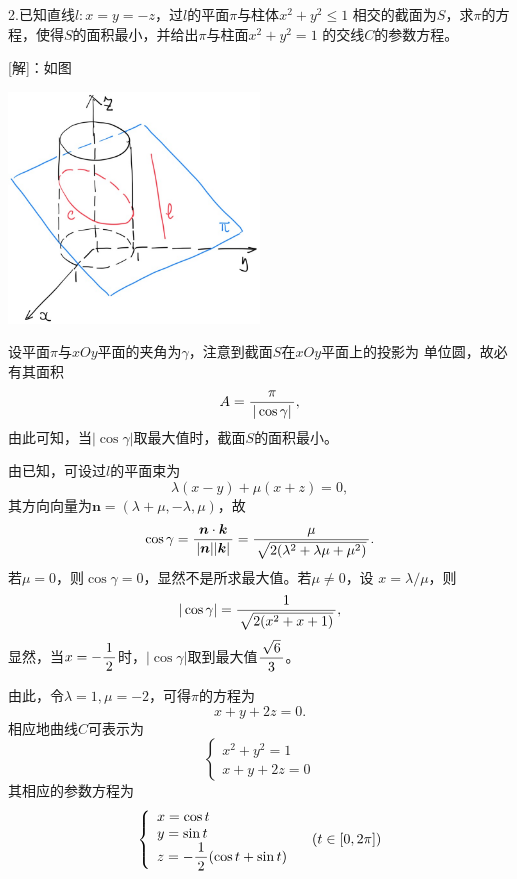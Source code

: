 \bs

2.已知直线$l:x=y=-z$，过$l$的平面$\pi$与柱体$x^2+y^2\leq1$
相交的截面为$S$，求$\pi$的方程，使得$S$的面积最小，并给出$\pi$与柱面$x^2+y^2=1$
的交线$C$的参数方程。

[解]：如图
\begin{center}
	\includegraphics[width=0.5\textwidth]{./images/ch8/ccS.jpg}
\end{center}
设平面$\pi$与$xOy$平面的夹角为$\gamma$，注意到截面$S$在$xOy$平面上的投影为
单位圆，故必有其面积
$$A=\displaystyle\frac{\,{\pi}\,}{\,{|\cos\gamma|}\,},$$
由此可知，当$|\cos\gamma|$取最大值时，截面$S$的面积最小。

由已知，可设过$l$的平面束为
$$\lambda(x-y)+\mu(x+z)=0,$$
其方向向量为$\bm{n}=(\lambda+\mu,-\lambda,\mu)$，故
$$\cos\gamma=\displaystyle\frac{\,{\bm{n}\cdot\bm{k}}\,}{\,{|\bm{n}||\bm{k}|}\,}
=\displaystyle\frac{\,{\mu}\,}{\,{\sqrt{2(\lambda^2+\lambda\mu+\mu^2)}}\,}.$$
若$\mu=0$，则$\cos\gamma=0$，显然不是所求最大值。若$\mu\ne0$，设
$x=\lambda/\mu$，则
$$|\cos\gamma|=\displaystyle\frac{\,{1}\,}{\,{\sqrt{2(x^2+x+1)}}\,},$$
显然，当$x=-\displaystyle\frac{\,{1}\,}{\,{2}\,}$时，$|\cos\gamma|$取到最大值$\displaystyle\frac{\,{\sqrt6}\,}{\,{3}\,}$。

由此，令$\lambda=1,\mu=-2$，可得$\pi$的方程为
$$x+y+2z=0.$$
相应地曲线$C$可表示为
$$\left\{\begin{array}{l}
	x^2+y^2=1\\
	x+y+2z=0
\end{array}\right.$$
其相应的参数方程为
$$\left\{\begin{array}{l}
	x=\cos t\\
	y=\sin t\\
	z=-\displaystyle\frac{\,{1}\,}{\,{2}\,}(\cos t+\sin t)
\end{array}\right.
\quad (t\in[0,2\pi])$$
\fin

\bs

